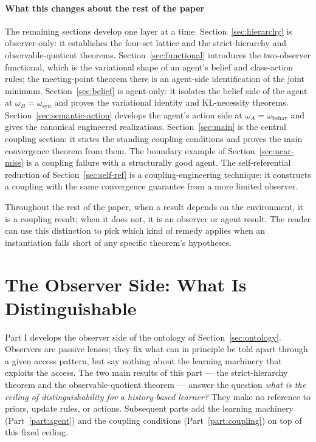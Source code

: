 \documentclass[11pt]{article}
\theoremstyle{definition}
\theoremstyle{remark}
\begin{document}
\subsection{What this changes about the rest of the paper}
\label{sec:ontology-roadmap}

The remaining sections develop one layer at a time. Section~\ref{sec:hierarchy} is observer-only: it establishes the four-set lattice and the strict-hierarchy and observable-quotient theorems. Section~\ref{sec:functional} introduces the two-observer functional, which is the variational shape of an agent's belief and class-action rules; the meeting-point theorem there is an agent-side identification of the joint minimum. Section~\ref{sec:belief} is agent-only: it isolates the belief side of the agent at $\omega_B=\omega_{\mathrm{syn}}$ and proves the variational identity and KL-necessity theorems. Section~\ref{sec:semantic-action} develops the agent's action side at $\omega_A=\omega_{\mathrm{behav}}$ and gives the canonical engineered realizations. Section~\ref{sec:main} is the central coupling section: it states the standing coupling conditions and proves the main convergence theorem from them. The boundary example of Section~\ref{sec:near-miss} is a coupling failure with a structurally good agent. The self-referential reduction of Section~\ref{sec:self-ref} is a coupling-engineering technique: it constructs a coupling with the same convergence guarantee from a more limited observer.

Throughout the rest of the paper, when a result depends on the environment, it is a coupling result; when it does not, it is an observer or agent result. The reader can use this distinction to pick which kind of remedy applies when an instantiation falls short of any specific theorem's hypotheses.

\part{The Observer Side: What Is Distinguishable}
\label{part:observer}

Part I develops the observer side of the ontology of Section~\ref{sec:ontology}. Observers are passive lenses; they fix what can in principle be told apart through a given access pattern, but say nothing about the learning machinery that exploits the access. The two main results of this part --- the strict-hierarchy theorem and the observable-quotient theorem --- answer the question \emph{what is the ceiling of distinguishability for a history-based learner?} They make no reference to priors, update rules, or actions. Subsequent parts add the learning machinery (Part~\ref{part:agent}) and the coupling conditions (Part~\ref{part:coupling}) on top of this fixed ceiling.
\end{document}
